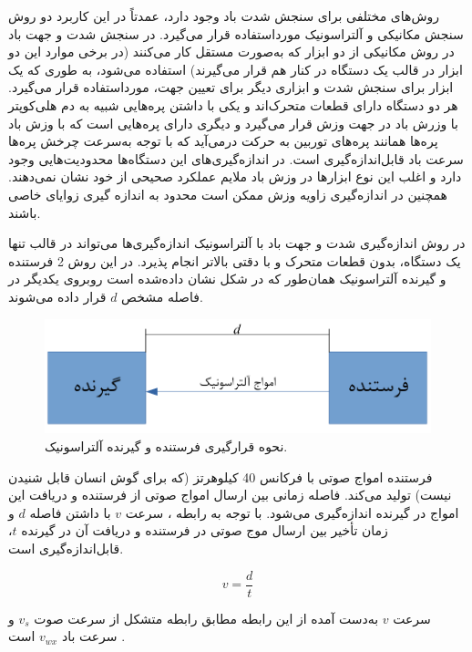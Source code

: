 روش‌های مختلفی برای سنجش شدت باد وجود دارد، عمدتاً در این کاربرد دو روش سنجش مکانیکی و آلتراسونیک  مورداستفاده قرار می‌گیرد. در سنجش شدت و جهت باد در روش مکانیکی از دو ابزار که به‌صورت مستقل کار می‌کنند (در برخی موارد این دو ابزار در قالب یک دستگاه در کنار هم قرار می‌گیرند) استفاده می‌شود، به طوری که یک ابزار برای سنجش شدت و ابزاری دیگر برای تعیین جهت، مورداستفاده قرار می‌گیرد. هر دو دستگاه دارای قطعات متحرک‌اند و یکی با داشتن پره‌هایی شبیه به دم هلی‌کوپتر با وزرش باد در جهت وزش قرار می‌گیرد و دیگری دارای پره‌هایی است که با وزش باد پره‌ها همانند پره‌های توربین به حرکت درمی‌آید که با توجه به‌سرعت چرخش پره‌ها سرعت باد قابل‌اندازه‌گیری است. در اندازه‌گیری‌های این دستگاه‌ها محدودیت‌هایی وجود دارد و اغلب این نوع ابزارها در وزش باد ملایم عملکرد صحیحی از خود نشان نمی‌دهند. همچنین در اندازه‌گیری زاویه وزش ممکن‌ است محدود به اندازه گیری زوایای خاصی باشند. 

در روش اندازه‌گیری شدت و جهت باد با آلتراسونیک اندازه‌گیری‌ها می‌تواند در قالب تنها یک دستگاه، بدون قطعات متحرک و با دقتی بالاتر انجام پذیرد. در این روش 2 فرستنده و گیرنده آلتراسونیک همان‌طور که در شکل  نشان داده‌شده است روبروی یکدیگر در فاصله مشخص $d$ قرار داده می‌شوند.

\begin{figure}[!h]
	\centering
	\includegraphics[width=0.6\linewidth]{Assets/ultrasonic one axis.pdf}
	\caption{نحوه قرارگیری فرستنده و گیرنده آلتراسونیک.}
	\label{fig:oneAxisUltrasonic}
\end{figure}

فرستنده امواج صوتی با فرکانس 40 کیلوهرتز (که برای گوش انسان قابل شنیدن نیست) تولید می‌کند. فاصله زمانی بین ارسال امواج صوتی از فرستنده و دریافت این امواج در گیرنده اندازه‌گیری می‌شود. با توجه به رابطه ، سرعت $v$ با داشتن فاصله $d$ و زمان تأخیر بین ارسال موج صوتی در فرستنده و دریافت آن در گیرنده  $t$، قابل‌اندازه‌گیری است.

\begin{equation}\label{eq:speed}
v = \frac{d}{t}
\end{equation}

سرعت $v$ به‌دست آمده از این رابطه مطابق رابطه  متشکل از سرعت صوت $v_s$ و سرعت باد $v_{wx}$  است .

